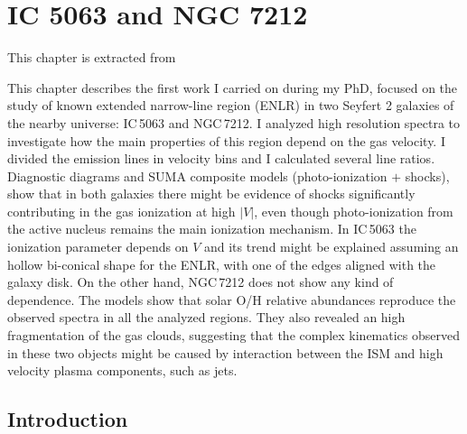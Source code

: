 \documentclass[../thesis.tex]{subfiles}
\begin{document}
\chapter[IC 5063 and NGC 7212]{IC 5063 and NGC 7212}
\label{cap:paper1}

\epigraph{This chapter is extracted from \citet{Congiu17b}}{}

This chapter describes the first work I carried on during my PhD, focused on the study of known extended narrow-line region (ENLR) in two Seyfert 2 galaxies of the nearby universe: IC\,5063 and NGC\,7212.
I analyzed high resolution spectra to investigate how the main properties of this region depend on the gas velocity.
I divided the emission lines in velocity bins and I calculated several line ratios.
Diagnostic diagrams and SUMA composite models (photo-ionization $+$ shocks), show that in both galaxies there might be evidence of shocks significantly contributing in the gas ionization at high $\lvert V \rvert$, even though photo-ionization from the active nucleus remains the main ionization mechanism.
In IC\,5063 the ionization parameter depends on $V$ and its trend might be explained assuming an hollow bi-conical shape for the ENLR, with one of the edges aligned with the galaxy disk.
On the other hand, NGC\,7212 does not show any kind of dependence.
The models show that solar O/H relative abundances reproduce the observed spectra in all the analyzed regions.
They also revealed an high fragmentation of the gas clouds, suggesting that the complex kinematics observed in these two objects might be caused by interaction between the ISM and high velocity plasma components, such as jets.

\section{Introduction}
\end{document}
